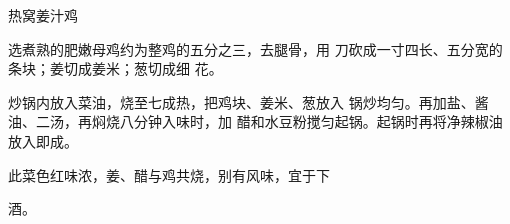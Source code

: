 \begin{recipe}{热窝姜汁鸡}

\ingredients


\cooking

\step 	选煮熟的肥嫩母鸡约为整鸡的五分之三，去腿骨，用 刀砍成一寸四长、五分宽的条块；姜切成姜米；葱切成细 花。

\step 	炒锅内放入菜油，烧至七成热，把鸡块、姜米、葱放入 锅炒均匀。再加盐、酱油、二汤，再焖烧八分钟入味时，加 醋和水豆粉搅匀起锅。起锅时再将净辣椒油放入即成。

\notes

此菜色红味浓，姜、醋与鸡共烧，别有风味，宜于下

酒。

\end{recipe}


